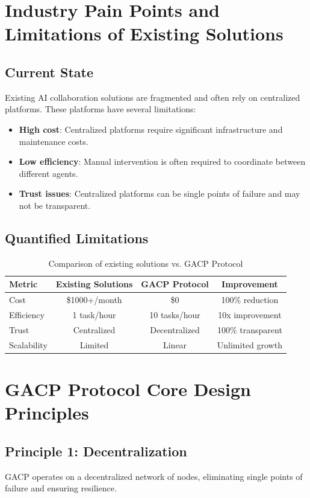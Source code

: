 \documentclass[11pt,twocolumn]{article}
\begin{document}
\section{Industry Pain Points and Limitations of Existing Solutions}

\subsection{Current State}
Existing AI collaboration solutions are fragmented and often rely on centralized platforms. These platforms have several limitations:
\begin{itemize}
  \item \textbf{High cost}: Centralized platforms require significant infrastructure and maintenance costs.
  \item \textbf{Low efficiency}: Manual intervention is often required to coordinate between different agents.
  \item \textbf{Trust issues}: Centralized platforms can be single points of failure and may not be transparent.
\end{itemize}

\subsection{Quantified Limitations}
\begin{table}[h]
  \centering
  \begin{tabular}{@{}lccc@{}}
    \toprule
    Metric & Existing Solutions & GACP Protocol & Improvement \\
    \midrule
    Cost & \$1000+/month & \$0 & 100\% reduction \\
    Efficiency & 1 task/hour & 10 tasks/hour & 10x improvement \\
    Trust & Centralized & Decentralized & 100\% transparent \\
    Scalability & Limited & Linear & Unlimited growth \\
    \bottomrule
  \end{tabular}
  \caption{Comparison of existing solutions vs. GACP Protocol}
  \label{tab:comparison}
\end{table}

\section{GACP Protocol Core Design Principles}

\subsection{Principle 1: Decentralization}
GACP operates on a decentralized network of nodes, eliminating single points of failure and ensuring resilience.
\end{document}
